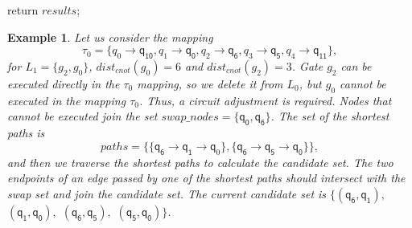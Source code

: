 \documentclass[journal]{IEEEtran}
\newtheorem{example}{Example}
\begin{document}
\begin{algorithm} [htbp]
          return $results$;
          
	\label{algorithm_neighborhood}
	\end{algorithm}

\begin{example}
	Let us consider the mapping $$\tau_{0}=\{\textit{q}_\textit{0}\rightarrow  \textsf{q}_{\textsf{10}},\textit{q}_\textit{1}\rightarrow \textsf{q}_{\textsf{0}},
\textit{q}_\textit{2}\rightarrow  \textsf{q}_{\textsf{6}},\textit{q}_\textit{3}\rightarrow  \textsf{q}_{\textsf{5}},\textit{q}_\textit{4}\rightarrow  \textsf{q}_{\textsf{11}}\} , $$ 
for $L_{1}=\{g_{2},g_{0}\}$, $dist_{cnot}(g_{0})=6$ and $dist_{cnot}(g_{2})=3$. 
Gate $g_{2}$ can be executed directly in the $\tau_{0}$ mapping, so we delete it from $L_{0}$,
but $g_{0}$ cannot be executed in the mapping $\tau_{0}$.
Thus, a circuit adjustment is required. 
Nodes that cannot be executed join the set $swap\_nodes=\{\textsf{q}_{\textsf{0}},\textsf{q}_\textsf{6}\}$.
The set of the shortest paths is $$paths=\{\{\textsf{q}_{\textsf{6}}\rightarrow \textsf{q}_{\textsf{1}} \rightarrow \textsf{q}_{0} \},\{\textsf{q}_\textsf{6}\rightarrow \textsf{q}_\textsf{5} \rightarrow \textsf{q}_\textsf{0} \}\},$$ 
and then we traverse the shortest paths to calculate the  candidate set.
The two endpoints of an edge passed by one of the shortest paths should intersect with the swap set and join the candidate set.
The current candidate set is $\{(\textsf{q}_\textsf{6},\textsf{q}_\textsf{1}),$ $(\textsf{q}_\textsf{1},\textsf{q}_\textsf{0}),$ $(\textsf{q}_\textsf{6},\textsf{q}_\textsf{5}),$ $(\textsf{q}_\textsf{5},\textsf{q}_\textsf{0}) \}$.
\end{example}
\end{document}

